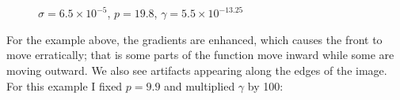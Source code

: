 \documentclass[margin=1in,12pt,3p]{elsarticle}
\begin{document}
\begin{figure}[h!]
  \centering
  \hfill
  \\
  \\
  \caption{$\sigma = 6.5\times 10^{-5}$, $p = 19.8$, $\gamma=5.5\times 10^{-13.25}$}
\end{figure}
For the example above, the gradients are enhanced, which causes the front to move erratically; that is some parts of the function move inward while some are moving outward. We also see artifacts appearing along the edges of the image.
\clearpage
For this example I fixed $p=9.9$ and multiplied $\gamma$ by 100:
\end{document}
